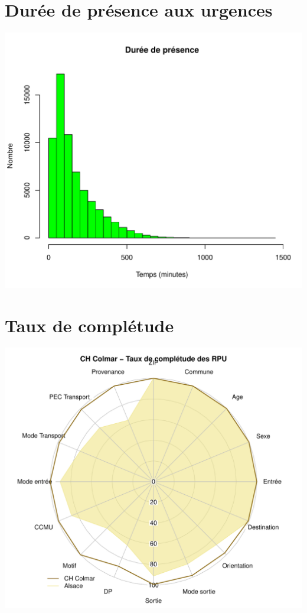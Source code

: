 \documentclass[12pt,english,french,twoside]{book}\usepackage[]{graphicx}\usepackage[]{color}
\makeatletter
\def\maxwidth{ %
  \ifdim\Gin@nat@width>\linewidth
    \linewidth
  \else
    \Gin@nat@width
  \fi
}
\newenvironment{knitrout}{}{} %
\makeatother
\begin{document}
\section*{Durée de présence aux urgences}
\begin{knitrout}
\color{fgcolor}
\includegraphics[width=\maxwidth]{figure/graphe_p_col} 

\end{knitrout}



\section*{Taux de complétude}

\begin{knitrout}
\color{fgcolor}
\includegraphics[width=\maxwidth]{figure/compl_col} 

\end{knitrout}
\end{document}
